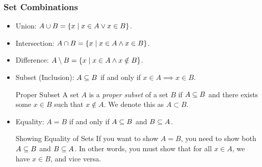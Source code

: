 \documentclass[class=article, crop=false]{standalone}
\begin{document}
  \subsubsection{Set Combinations}
  \begin{itemize}
    \item Union: $A\cup B = \left\{x\mid x\in A\lor x\in B\right\}$.
    \item Intersection: $A\cap B = \left\{x\mid x\in A\land x\in B\right\}$.
    \item Difference: $A\setminus B = \left\{x\mid x\in A\land x\notin B\right\}$.
    \item Subset (Inclusion): $A\subseteq B$ if and only if $x\in A\implies x\in B$.
    \begin{definition}{Proper Subset}
      A set $A$ is a \emph{proper subset} of a set $B$ if $A\subseteq B$ and there exists some $x\in B$ such that $x\notin A$. We denote this as $A\subset B$.
    \end{definition}
    \item Equality: $A = B$ if and only if $A\subseteq B$ and $B\subseteq A$.
    \begin{note}{Showing Equality of Sets}
      If you want to show $A = B$, you need to show both $A\subseteq B$ and $B\subseteq A$. In other words, you must show that for all $x\in A$, we have $x\in B$, and vice versa.
    \end{note}
  \end{itemize}
\end{document}
